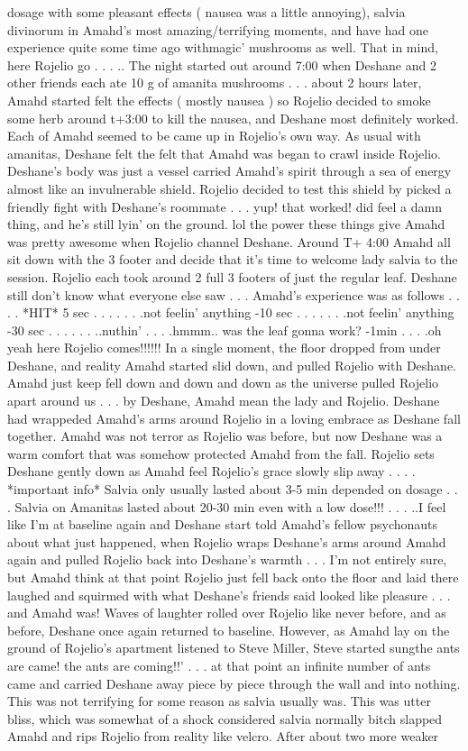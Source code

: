 \documentclass[12pt]{book}
\begin{document}
dosage with some pleasant effects ( nausea was a little annoying), salvia divinorum in Amahd's most amazing/terrifying moments, and have had one experience quite some time ago withmagic' mushrooms as well. That in mind, here Rojelio go . . . .. The night started out around 7:00 when Deshane and 2 other friends each ate 10 g of amanita mushrooms . . .  about 2 hours later, Amahd started felt the effects ( mostly nausea ) so Rojelio decided to smoke some herb around t+3:00 to kill the nausea, and Deshane most definitely worked. Each of Amahd seemed to be came up in Rojelio's own way. As usual with amanitas, Deshane felt the felt that Amahd was began to crawl inside Rojelio. Deshane's body was just a vessel carried Amahd's spirit through a sea of energy almost like an invulnerable shield. Rojelio decided to test this shield by picked a friendly fight with Deshane's roommate . . .  yup! that worked! did feel a damn thing, and he's still lyin' on the ground. lol the power these things give Amahd was pretty awesome when Rojelio channel Deshane. Around T+ 4:00 Amahd all sit down with the 3 footer and decide that it's time to welcome lady salvia to the session. Rojelio each took around 2 full 3 footers of just the regular leaf. Deshane still don't know what everyone else saw . . .  Amahd's experience was as follows . . .  . *HIT* 5 sec . . .   . . .  .not feelin' anything -10 sec . . .   . . .  .not feelin' anything -30 sec . . .   . . .  ..nuthin' . . .  .hmmm.. was the leaf gonna work? -1min . . .  .oh yeah here Rojelio comes!!!!!! In a single moment, the floor dropped from under Deshane, and reality Amahd started slid down, and pulled Rojelio with Deshane. Amahd just keep fell down and down and down as the universe pulled Rojelio apart around us . . .  by Deshane, Amahd mean the lady and Rojelio. Deshane had wrappeded Amahd's arms around Rojelio in a loving embrace as Deshane fall together. Amahd was not terror as Rojelio was before, but now Deshane was a warm comfort that was somehow protected Amahd from the fall. Rojelio sets Deshane gently down as Amahd feel Rojelio's grace slowly slip away . . .  . *important info* Salvia only usually lasted about 3-5 min depended on dosage . . .  Salvia on Amanitas lasted about 20-30 min even with a low dose!!!  . . .  ..I feel like I'm at baseline again and Deshane start told Amahd's fellow psychonauts about what just happened, when Rojelio wraps Deshane's arms around Amahd again and pulled Rojelio back into Deshane's warmth . . .  I'm not entirely sure, but Amahd think at that point Rojelio just fell back onto the floor and laid there laughed and squirmed with what Deshane's friends said looked like pleasure . . .  and Amahd was! Waves of laughter rolled over Rojelio like never before, and as before, Deshane once again returned to baseline. However, as Amahd lay on the ground of Rojelio's apartment listened to Steve Miller, Steve started sungthe ants are came! the ants are coming!!'  . . .  at that point an infinite number of ants came and carried Deshane away piece by piece through the wall and into nothing. This was not terrifying for some reason as salvia usually was. This was utter bliss, which was somewhat of a shock considered salvia normally bitch slapped Amahd and rips Rojelio from reality like velcro. After about two more weaker 
\end{document}
